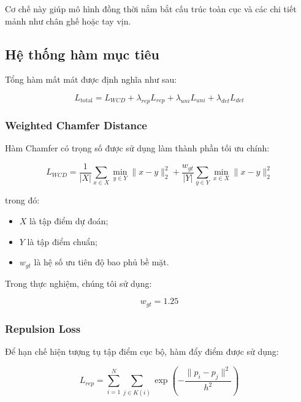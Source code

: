 \documentclass[conference,a4paper]{IEEEtran}
\begin{document}
Cơ chế này giúp mô hình đồng thời nắm bắt cấu trúc toàn cục và các chi tiết mảnh như chân ghế hoặc tay vịn.

\subsection{Hệ thống hàm mục tiêu}

Tổng hàm mất mát được định nghĩa như sau:

\begin{equation}
L_{\text{total}}
=
L_{WCD}
+
\lambda_{rep}L_{rep}
+
\lambda_{uni}L_{uni}
+
\lambda_{det}L_{det}
\end{equation}

\subsubsection{Weighted Chamfer Distance}

Hàm Chamfer có trọng số được sử dụng làm thành phần tối ưu chính:

\begin{equation}
L_{WCD}
=
\frac{1}{|X|}
\sum_{x \in X}
\min_{y \in Y}
\|x-y\|_2^2
+
\frac{w_{gt}}{|Y|}
\sum_{y \in Y}
\min_{x \in X}
\|x-y\|_2^2
\end{equation}

trong đó:

\begin{itemize}
    \item $X$ là tập điểm dự đoán;
    \item $Y$ là tập điểm chuẩn;
    \item $w_{gt}$ là hệ số ưu tiên độ bao phủ bề mặt.
\end{itemize}

Trong thực nghiệm, chúng tôi sử dụng:

\begin{equation}
w_{gt}=1.25
\end{equation}

\subsubsection{Repulsion Loss}

Để hạn chế hiện tượng tụ tập điểm cục bộ, hàm đẩy điểm được sử dụng:

\begin{equation}
L_{rep}
=
\sum_{i=1}^{N}
\sum_{j \in K(i)}
\exp
\left(
-
\frac{\|p_i-p_j\|^2}{h^2}
\right)
\end{equation}
\end{document}
